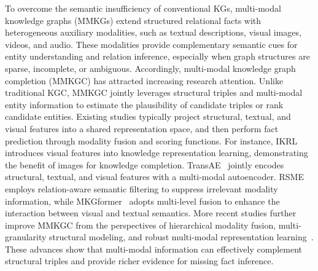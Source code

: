 \documentclass[a4paper,fleqn]{cas-sc}
\begin{document}
To overcome the semantic insufficiency of conventional KGs, multi-modal knowledge graphs (MMKGs) extend structured relational facts with heterogeneous auxiliary modalities, such as textual descriptions, visual images, videos, and audio. These modalities provide complementary semantic cues for entity understanding and relation inference, especially when graph structures are sparse, incomplete, or ambiguous. Accordingly, multi-modal knowledge graph completion (MMKGC) has attracted increasing research attention. Unlike traditional KGC, MMKGC jointly leverages structural triples and multi-modal entity information to estimate the plausibility of candidate triples or rank candidate entities. Existing studies typically project structural, textual, and visual features into a shared representation space, and then perform fact prediction through modality fusion and scoring functions. For instance, IKRL~\cite{xie2017ikrl} introduces visual features into knowledge representation learning, demonstrating the benefit of images for knowledge completion. TransAE~\cite{wang2019transae} jointly encodes structural, textual, and visual features with a multi-modal autoencoder. RSME~\cite{wang2021rsme} employs relation-aware semantic filtering to suppress irrelevant modality information, while MKGformer~\cite{chen2022mkgformer} adopts multi-level fusion to enhance the interaction between visual and textual semantics. More recent studies further improve MMKGC from the perspectives of hierarchical modality fusion, multi-granularity structural modeling, and robust multi-modal representation learning~\cite{wang2026hfr,li2026safer,liu2026mhyper}. These advances show that multi-modal information can effectively complement structural triples and provide richer evidence for missing fact inference.
\end{document}
